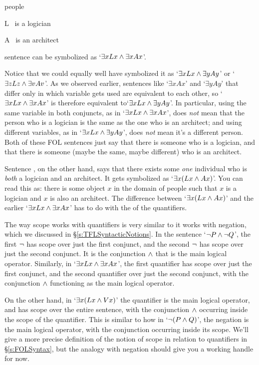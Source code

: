 	\begin{ekey}
		\item[\text{domain}] people
		\item[L] \blank\ is a logician
		\item[A]\blank\ is an architect
	\end{ekey}
sentence  can be symbolized as `$\exists xLx \wedge \exists xAx$'.

 Notice that we could equally well have symbolized it as `$\exists x Lx \wedge \exists yAy$' or `$\exists zLz \wedge \exists v Av$'.  As we observed earlier, sentences like `$\exists x Ax$' and `$\exists y Ay$' that differ only in which variable gets used are equivalent to each other, so  `$\exists xLx \wedge \exists xAx$' is therefore equivalent to`$\exists x Lx \wedge \exists yAy$'.  In particular, using the same variable in both conjuncts, as in `$\exists xLx \wedge \exists xAx$', does \emph{not} mean that the person who is a logician is the same as the one who is an architect; and using different variables, as in `$\exists x Lx \wedge \exists yAy$',  does \emph{not} mean it's a different person.  Both of these FOL sentences just say that there is someone who is a logician, and that there is someone (maybe the same, maybe different) who is an architect.



Sentence , on the other hand, says that there exists some \emph{one} individual who is \emph{both} a logician and an architect.  It gets symbolized as `$\exists x(Lx \wedge Ax)$'.   You can read this as: there is some object $x$ in the domain of people such that $x$ is a logician and $x$ is also an architect.  The difference between `$\exists x(Lx \wedge Ax)$'  and the earlier `$\exists xLx \wedge \exists xAx$' has to do with the  of the quantifiers.

The way scope works with quantifiers is very similar to it works with negation, which we discussed in \S\ref{s:TFLSyntacticNotions}.   In the sentence `$\neg P \wedge \neg Q$', the first $\neg$ has scope over just the first conjunct, and the second $\neg$ has scope over just the second conjunct.   It is the conjunction $\wedge$ that is the main logical operator.  Similarly, in `$\exists xLx \wedge \exists xAx$', the first quantifier has scope over just the first conjunct, and the second quantifier over just the second conjunct, with the conjunction $\wedge$ functioning as the main logical operator.

On the other hand, in `$\exists x(Lx \wedge Vx)$' the quantifier is the main logical operator, and has scope over the entire sentence, with the conjunction $\wedge$ occurring inside the scope of the quantifier.  This is similar to how in `$\neg (P \wedge Q)$', the negation is the main logical operator, with the conjunction occurring inside its scope.  We'll give a more precise definition of the notion of scope in relation to quantifiers in \S\ref{s:FOLSyntax}, but the analogy with negation should give you a working handle for now.

